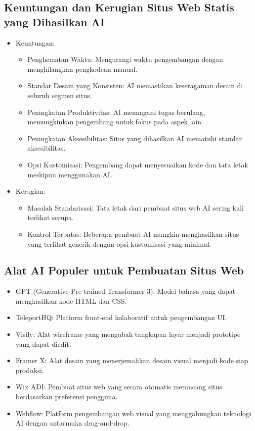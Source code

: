 \documentclass{article}
\begin{document}
\subsection{Keuntungan dan Kerugian Situs Web Statis yang Dihasilkan AI}
\begin{itemize}
    \item Keuntungan:
          \begin{itemize}
              \item Penghematan Waktu: Mengurangi waktu pengembangan dengan menghilangkan pengkodean manual.
              \item Standar Desain yang Konsisten: AI memastikan keseragaman desain di seluruh segmen situs.
              \item Peningkatan Produktivitas: AI menangani tugas berulang, memungkinkan pengembang untuk fokus pada aspek lain.
              \item Peningkatan Aksesibilitas: Situs yang dihasilkan AI mematuhi standar aksesibilitas.
              \item Opsi Kustomisasi: Pengembang dapat menyesuaikan kode dan tata letak meskipun menggunakan AI.
          \end{itemize}
    \item Kerugian:
          \begin{itemize}
              \item Masalah Standarisasi: Tata letak dari pembuat situs web AI sering kali terlihat serupa.
              \item Kontrol Terbatas: Beberapa pembuat AI mungkin menghasilkan situs yang terlihat generik dengan opsi kustomisasi yang minimal.
          \end{itemize}
\end{itemize}

\subsection{Alat AI Populer untuk Pembuatan Situs Web}
\begin{itemize}
    \item GPT (Generative Pre-trained Transformer 3): Model bahasa yang dapat menghasilkan kode HTML dan CSS.
    \item TeleportHQ: Platform front-end kolaboratif untuk pengembangan UI.
    \item Visily: Alat wireframe yang mengubah tangkapan layar menjadi prototipe yang dapat diedit.
    \item Framer X: Alat desain yang menerjemahkan desain visual menjadi kode siap produksi.
    \item Wix ADI: Pembuat situs web yang secara otomatis merancang situs berdasarkan preferensi pengguna.
    \item Webflow: Platform pengembangan web visual yang menggabungkan teknologi AI dengan antarmuka drag-and-drop.
\end{itemize}
\end{document}
